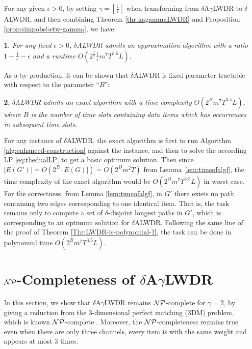 \documentclass[11pt,english,onecolumn,draftcls]{IEEEtran}
\theoremstyle{plain}
\newtheorem{thm}{\protect\theoremname}
\theoremstyle{plain}
\theoremstyle{plain}
\theoremstyle{plain}
\newtheorem{cor}[thm]{\protect\corollaryname}
\providecommand{\corollaryname}{Corollary}
\providecommand{\theoremname}{Theorem}
\begin{document}
For any given $\epsilon>0$, by setting $\gamma=\left\lfloor \frac{1}{\epsilon}\right\rfloor $
when transforming from $\delta$A$\gamma$LWDR to $\delta$ALWDR,
and then combining Theorem \ref{thr:kagammaLWDR} and Proposition
\ref{prop:simpobsbetw-gamma}, we have:
\begin{thm}
\label{thm:finalratioforkLWDR}For any fixed $\epsilon>0$, $\delta$ALWDR
admits an approximation algorithm with a ratio $1-\frac{1}{e}-\epsilon$
and a runtime $O(2^{\frac{1}{\epsilon}}\frac{1}{\epsilon}m^{7}T^{3.5}L)$.
\end{thm}
As a by-production, it can be shown that $\delta$ALWDR is fixed parameter
tractable with respect to the parameter ``$B$'':
\begin{cor}
$\delta$ALWDR admits an exact algorithm with a time complexity $O(2^{B}m^{7}T^{3.5}L)$,
where $B$ is the number of time slots containing data items which
has occurrences in subsequent time slots.\end{cor}
\begin{IEEEproof}
For any instance of $\delta$ALWDR, the exact algorithm is first to
run Algorithm \ref{alg:enhanced-construction} against the instance,
and then to solve the according LP \ref{eq:thedualLP} to get a basic
optimum solution. Then since $\vert E(G')\vert=O(2^{B}\cdot\vert E(G)\vert)=O(2^{B}m^{2}T)$
from Lemma \ref{lem:timeofalgf}, the time complexity of the exact
algorithm would be $O(2^{B}m^{7}T^{3.5}L)$ in worst case. For the
correctness, from Lemma \ref{lem:timeofalgf}, in $G'$ there exists
no path containing two edges corresponding to one identical item.
That is, the task remains only to compute a set of $\delta$-disjoint
longest paths in $G'$, which is corresponding to an optimum solution
for $\delta$ALWDR. Following the same line of the proof of Theorem
\ref{Thr:LWDR-is-polynomial-1}, the task can be done in polynomial
time $O(2^{B}m^{7}T^{3.5}L)$.
\end{IEEEproof}

\section{${\cal NP}$-Completeness of $\delta$A$\gamma$LWDR }

In this section, we show that $\delta$A$\gamma$LWDR remains ${\cal NP}$-complete
for $\gamma=2$, by giving a reduction from the 3-dimensional perfect
matching (3DM) problem, which is known ${\cal NP}$-complete \cite{garey1979computer}.
Moreover, the ${\cal NP}$-completeness remains true even when there
are only three channels, every item is with the same weight and appears
at most 3 times.
\end{document}
